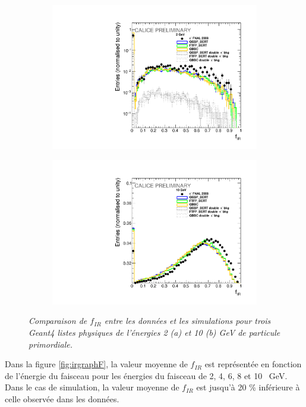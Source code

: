 \begin{figure}
	\centering
	\begin{subfigure}{0.5\textwidth}
		\centering
		\includegraphics[width=.90\linewidth]{ECAL/plots/e-ir-2.pdf}
		\caption{\label{fig:efr2F} }
	\end{subfigure}%
	\begin{subfigure}{0.5\textwidth}
		\centering
		\includegraphics[width=.90\linewidth]{ECAL/plots/e-ir-10.pdf}
		\caption{\label{fig:efr10F} }
	\end{subfigure}
	\caption{\label{fig:irexampleF} \sl%
		Comparaison de $f_{IR}$ entre les données et les simulations pour trois {\sc Geant}4  listes physiques de l'\'energies 2 (a) et 10 (b) GeV de particule primordiale.}
\end{figure}

Dans la figure \ref{fig:irgraphF}, la valeur moyenne de $f_ {IR}$ est représentée en fonction de l'énergie du faisceau pour les énergies du faisceau de 2, 4, 6, 8 et 10 \, GeV.
Dans le cas de simulation, la valeur moyenne de $f_ {IR}$ est jusqu'à 20 \% inférieure à celle observée dans les données.

